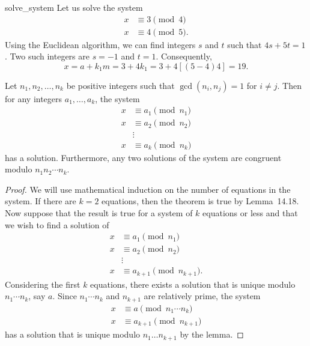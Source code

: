  
\begin{example}{solve_system}
Let us solve the system
\begin{align*}
x & \equiv  3 \pmod{4} \\
x & \equiv  4 \pmod{5}. 
\end{align*}
Using the Euclidean algorithm, we can find integers $s$ and $t$ such
that $4s + 5t =1$. Two such integers are $s = -1$ and $t = 1$.
Consequently,
\[
x = a + k_1 m = 3 + 4k_1 = 3 + 4[(5-4)4] = 19.
\]
\end{example}
 
 
\begin{theorem}
Let $n_1, n_2, \ldots, n_k$ be positive integers such that $\gcd(n_i, n_j)
= 1$ for $i \neq j$. Then for any integers $a_1, \ldots, a_k$, the
system
\begin{align*}
x & \equiv  a_1 \pmod{n_1} \\
x & \equiv  a_2 \pmod{n_2} \\
 &  \vdots  \\
x & \equiv  a_k \pmod{n_k}
\end{align*}
has a solution.  Furthermore, any two solutions of the system are
congruent modulo $n_1 n_2 \cdots n_k$.
\end{theorem}
 
\begin{proof}
We will use mathematical induction on the number of equations in the
system. If there are $k= 2$ equations, then the theorem is true by 
Lemma~14.18. Now suppose that the result is true for a system of $k$ 
equations or less and that we wish to find a solution of 
\begin{align*}
x & \equiv  a_1 \pmod{n_1} \\
x & \equiv  a_2 \pmod{n_2} \\
  & \vdots  \\
x & \equiv  a_{k+1} \pmod{n_{k+1}}.
\end{align*}
Considering the first $k$ equations, there exists a solution that is
unique modulo $n_1 \cdots n_k$, say $a$. Since $n_1 \cdots n_k$ and
$n_{k+1}$ are relatively prime, the system 
\begin{align*}
x & \equiv  a \pmod{n_1 \cdots n_k } \\
x & \equiv  a_{k+1} \pmod{n_{k+1}}
\end{align*}
has a solution that is unique modulo $n_1 \ldots n_{k+1}$ by the
lemma.
\end{proof}
 
